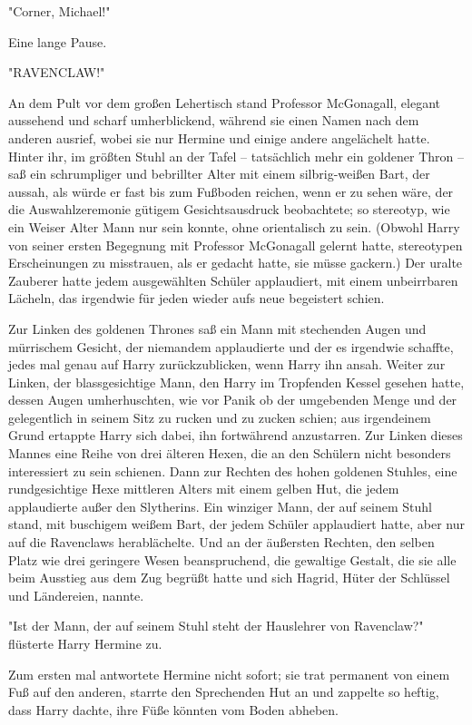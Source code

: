{"Corner, Michael!"

Eine lange Pause.

"RAVENCLAW!"

An dem Pult vor dem großen Lehertisch stand Professor McGonagall, elegant aussehend und scharf umherblickend, während sie einen Namen nach dem anderen ausrief, wobei sie nur Hermine und einige andere angelächelt hatte. Hinter ihr, im größten Stuhl an der Tafel -- tatsächlich mehr ein goldener Thron -- saß ein schrumpliger und bebrillter Alter mit einem silbrig-weißen Bart, der aussah, als würde er fast bis zum Fußboden reichen, wenn er zu sehen wäre, der die Auswahlzeremonie gütigem Gesichtsausdruck beobachtete; so stereotyp, wie ein Weiser Alter Mann nur sein konnte, ohne orientalisch zu sein. (Obwohl Harry von seiner ersten Begegnung mit Professor McGonagall gelernt hatte, stereotypen Erscheinungen zu misstrauen, als er gedacht hatte, sie müsse gackern.) Der uralte Zauberer hatte jedem ausgewählten Schüler applaudiert, mit einem unbeirrbaren Lächeln, das irgendwie für jeden wieder aufs neue begeistert schien.

Zur Linken des goldenen Thrones saß ein Mann mit stechenden Augen und mürrischem Gesicht, der niemandem applaudierte und der es irgendwie schaffte, jedes mal genau auf Harry zurückzublicken, wenn Harry ihn ansah. Weiter zur Linken, der blassgesichtige Mann, den Harry im Tropfenden Kessel gesehen hatte, dessen Augen umherhuschten, wie vor Panik ob der umgebenden Menge und der gelegentlich in seinem Sitz zu rucken und zu zucken schien; aus irgendeinem Grund ertappte Harry sich dabei, ihn fortwährend anzustarren. Zur Linken dieses Mannes eine Reihe von drei älteren Hexen, die an den Schülern nicht besonders interessiert zu sein schienen. Dann zur Rechten des hohen goldenen Stuhles, eine rundgesichtige Hexe mittleren Alters mit einem gelben Hut, die jedem applaudierte außer den Slytherins. Ein winziger Mann, der auf seinem Stuhl stand, mit buschigem weißem Bart, der jedem Schüler applaudiert hatte, aber nur auf die Ravenclaws herablächelte. Und an der äußersten Rechten, den selben Platz wie drei geringere Wesen beanspruchend, die gewaltige Gestalt, die sie alle beim Ausstieg aus dem Zug begrüßt hatte und sich Hagrid, Hüter der Schlüssel und Ländereien, nannte.

"Ist der Mann, der auf seinem Stuhl steht der Hauslehrer von Ravenclaw?" flüsterte Harry Hermine zu.

Zum ersten mal antwortete Hermine nicht sofort; sie trat permanent von einem Fuß auf den anderen, starrte den Sprechenden Hut an und zappelte so heftig, dass Harry dachte, ihre Füße könnten vom Boden abheben.

}
